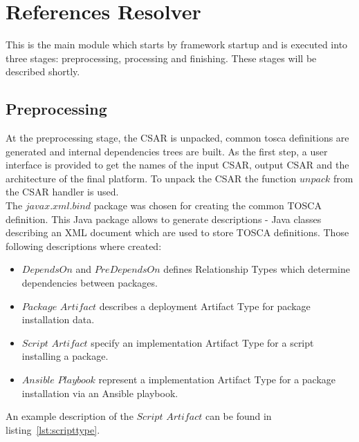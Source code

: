 \section{References Resolver}
This is the main module which starts by framework startup and is executed into three stages: preprocessing, processing and finishing. 
These stages will be described shortly.

\subsection*{Preprocessing}
At the preprocessing stage, the CSAR is unpacked, common \gls{tosca} definitions are generated and internal dependencies trees are built. 
%
As the first step, a user interface is provided to get the names of the input CSAR, output CSAR and the architecture of the final platform.
To unpack the CSAR the function $unpack$ from the CSAR handler is used.\\
%
The $javax$.$xml$.$bind$ package was chosen for creating the common TOSCA definition. 
This Java package allows to generate descriptions - Java classes describing an XML document which are used to store TOSCA definitions. 
Those following descriptions where created:
\begin{itemize}
	\item $DependsOn$ and $PreDependsOn$ defines Relationship Types which determine dependencies %
	  between packages.%
	\item $Package$ $Artifact$ describes a deployment Artifact Type for package installation data.
	\item $Script$ $Artifact$ specify an implementation Artifact Type for a script installing a package.
	\item $Ansible$ $Playbook$ represent a implementation Artifact Type for a package installation via an Ansible playbook.
\end{itemize}
An example description of the $Script$ $Artifact$ can be found in listing~\ref{lst:scripttype}.
